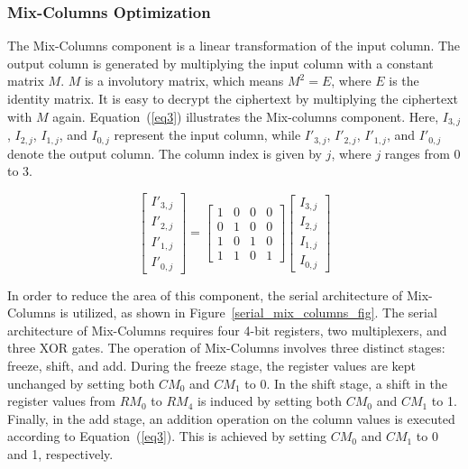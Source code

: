 \documentclass[final,5p,times,twocolumn]{elsarticle}
\begin{document}
\subsubsection{Mix-Columns Optimization}\label{subsubsec2}

The Mix-Columns component is a linear transformation of the input column.
The output column is generated by multiplying the input column with a constant matrix $M$.
$M$ is a involutory matrix, which means $M^2 = E$, where $E$ is the identity matrix.
It is easy to decrypt the ciphertext by multiplying the ciphertext with $M$ again.
Equation~(\ref{eq3}) illustrates the Mix-columns component.
Here, $I_{3,j}$, $I_{2,j}$, $I_{1,j}$, and $I_{0,j}$ represent the input column, while $I'_{3,j}$, $I'_{2,j}$, $I'_{1,j}$, and $I'_{0,j}$ denote the output column.
The column index is given by $j$, where $j$ ranges from 0 to 3.

\begin{equation}
    \begin{bmatrix}
        I'_{3,j} \\
        I'_{2,j} \\
        I'_{1,j} \\
        I'_{0,j}
    \end{bmatrix}
    =
    \begin{bmatrix}
        1 & 0 & 0 & 0 \\
        0 & 1 & 0 & 0 \\
        1 & 0 & 1 & 0 \\
        1 & 1 & 0 & 1
    \end{bmatrix}
    \begin{bmatrix}
        I_{3,j} \\
        I_{2,j} \\
        I_{1,j} \\
        I_{0,j}
    \end{bmatrix}
    \label{eq3}
\end{equation}


In order to reduce the area of this component, the serial architecture of Mix-Columns is utilized, as shown in Figure~\ref{serial_mix_columns_fig}.
The serial architecture of Mix-Columns requires four 4-bit registers, two multiplexers, and three XOR gates.
The operation of Mix-Columns involves three distinct stages: freeze, shift, and add.
During the freeze stage, the register values are kept unchanged by setting both $CM_0$ and $CM_1$ to 0.
In the shift stage, a shift in the register values from $RM_0$ to $RM_4$ is induced by setting both $CM_0$ and $CM_1$ to 1.
Finally, in the add stage, an addition operation on the column values is executed according to Equation~(\ref{eq3}). This is achieved by setting $CM_0$ and $CM_1$ to 0 and 1, respectively.
\end{document}
